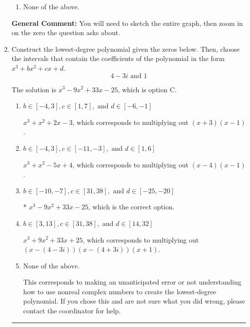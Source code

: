 \documentclass{extbook}[14pt]
\newcommand{\litem}[1]{\item #1

\rule{\textwidth}{0.4pt}}
\begin{document}
\begin{enumerate}
{\begin{enumerate}[label=\Alph*.]
\item None of the above.\end{enumerate}
\textbf{General Comment:} You will need to sketch the entire graph, then zoom in on the zero the question asks about.
}
\litem{
Construct the lowest-degree polynomial given the zeros below. Then, choose the intervals that contain the coefficients of the polynomial in the form $x^3+bx^2+cx+d$.
\[ 4 - 3 i \text{ and } 1 \]

The solution is \( x^{3} -9 x^{2} +33 x -25 \), which is option C.\begin{enumerate}[label=\Alph*.]
\item \( b \in [-4, 3], c \in [1, 7], \text{ and } d \in [-6, -1] \)

$x^{3} + x^{2} +2 x -3$, which corresponds to multiplying out $(x + 3)(x -1)$.
\item \( b \in [-4, 3], c \in [-11, -3], \text{ and } d \in [1, 6] \)

$x^{3} + x^{2} -5 x + 4$, which corresponds to multiplying out $(x -4)(x -1)$.
\item \( b \in [-10, -7], c \in [31, 38], \text{ and } d \in [-25, -20] \)

* $x^{3} -9 x^{2} +33 x -25$, which is the correct option.
\item \( b \in [3, 13], c \in [31, 38], \text{ and } d \in [14, 32] \)

$x^{3} +9 x^{2} +33 x + 25$, which corresponds to multiplying out $(x-(4 - 3 i))(x-(4 + 3 i))(x + 1)$.
\item \( \text{None of the above.} \)

This corresponds to making an unanticipated error or not understanding how to use nonreal complex numbers to create the lowest-degree polynomial. If you chose this and are not sure what you did wrong, please contact the coordinator for help.
\end{enumerate}

}
\end{enumerate}
\end{document}
